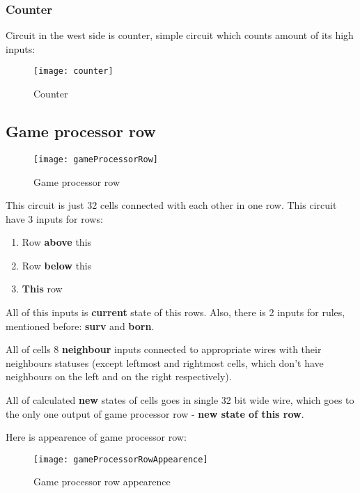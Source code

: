 \subsubsection*{Counter}

Circuit in the west side is counter, simple circuit which counts amount of its high inputs:

\begin{figure}[ht]
	\centering
	\texttt{[image: counter]}
	\caption{Counter}
\end{figure}

\subsection*{Game processor row}

\begin{figure}[ht]
	\centering
	\texttt{[image: gameProcessorRow]}
	\caption{Game processor row}
\end{figure}

This circuit is just 32 cells connected with each other in one row. This circuit have 3 inputs for rows:

\begin{enumerate}
	\item Row \textbf{above} this
	\item Row \textbf{below} this
	\item \textbf{This} row
\end{enumerate}

All of this inputs is \textbf{current} state of this rows.
Also, there is 2 inputs for rules, mentioned before: \textbf{surv} and \textbf{born}.

All of cells 8 \textbf{neighbour} inputs connected to appropriate wires with their neighbours statuses (except leftmost and rightmost cells, which don't have neighbours on the left and on the right respectively).

All of calculated \textbf{new} states of cells goes in single 32 bit wide wire, which goes to the only one output of game processor row - \textbf{new state of this row}.

Here is appearence of game processor row:

\begin{figure}[ht]
	\centering
	\texttt{[image: gameProcessorRowAppearence]}
	\caption{Game processor row appearence}
\end{figure}

